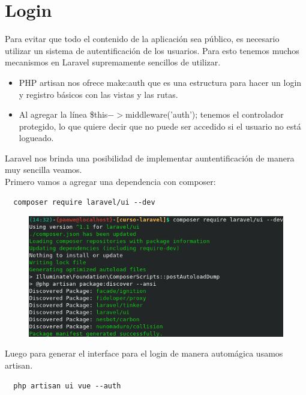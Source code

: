 \documentclass{article}
\begin{document}
\newpage

\section{Login}%
Para evitar que todo el contenido de la aplicación sea público, es necesario
utilizar un sistema de autentificación de los usuarios. Para esto tenemos
muchos mecanismos en Laravel supremamente sencillos de utilizar.\\

\begin{itemize}
  \item PHP artisan nos ofrece make:auth que es una estructura para hacer un
    login y registro básicos con las vistas y las rutas.
  \item Al agregar la línea \$this$->$middleware('auth'); tenemos el controlador
    protegido, lo que quiere decir que no puede ser accedido si el usuario no
    está logueado.
\end{itemize}

Laravel nos brinda una posibilidad de implementar auntentificación de manera
muy sencilla veamos.\\

Primero vamos a agregar una dependencia con composer:

\begin{verbatim}
  composer require laravel/ui --dev
\end{verbatim}

\begin{figure}[h!]
  \centering
  \includegraphics[scale=0.75]{./Pictures/125_composer_ui.png}
\end{figure}

Luego para generar el interface para el login de manera automágica usamos
artisan.\\

\begin{verbatim}
  php artisan ui vue --auth
\end{verbatim}
\end{document}
